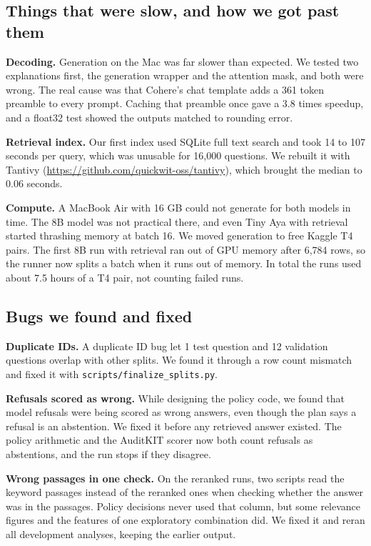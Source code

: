 \documentclass[11pt,a4paper]{article}
\begin{document}
\subsection{Things that were slow, and how we got past them}

\textbf{Decoding.} Generation on the Mac was far slower than expected. We tested two explanations first, the generation wrapper and the attention mask, and both were wrong. The real cause was that Cohere's chat template adds a 361 token preamble to every prompt. Caching that preamble once gave a 3.8 times speedup, and a float32 test showed the outputs matched to rounding error.

\textbf{Retrieval index.} Our first index used SQLite full text search and took 14 to 107 seconds per query, which was unusable for 16,000 questions. We rebuilt it with Tantivy (\url{https://github.com/quickwit-oss/tantivy}), which brought the median to 0.06 seconds.

\textbf{Compute.} A MacBook Air with 16 GB could not generate for both models in time. The 8B model was not practical there, and even Tiny Aya with retrieval started thrashing memory at batch 16. We moved generation to free Kaggle T4 pairs. The first 8B run with retrieval ran out of GPU memory after 6,784 rows, so the runner now splits a batch when it runs out of memory. In total the runs used about 7.5 hours of a T4 pair, not counting failed runs.

\subsection{Bugs we found and fixed}

\textbf{Duplicate IDs.} A duplicate ID bug let 1 test question and 12 validation questions overlap with other splits. We found it through a row count mismatch and fixed it with \nolinkurl{scripts/finalize_splits.py}.

\textbf{Refusals scored as wrong.} While designing the policy code, we found that model refusals were being scored as wrong answers, even though the plan says a refusal is an abstention. We fixed it before any retrieved answer existed. The policy arithmetic and the AuditKIT scorer now both count refusals as abstentions, and the run stops if they disagree.

\textbf{Wrong passages in one check.} On the reranked runs, two scripts read the keyword passages instead of the reranked ones when checking whether the answer was in the passages. Policy decisions never used that column, but some relevance figures and the features of one exploratory combination did. We fixed it and reran all development analyses, keeping the earlier output.
\end{document}

